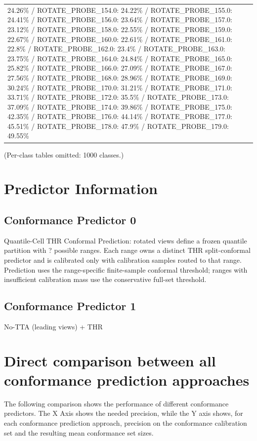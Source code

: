 \documentclass[parskip=half]{scrartcl}
\begin{document}
\begin{tabular}{l|l}
24.26\% / ROTATE_PROBE_154.0: 24.22\% / ROTATE_PROBE_155.0: 24.41\% / ROTATE_PROBE_156.0: 23.64\% / ROTATE_PROBE_157.0: 23.12\% / ROTATE_PROBE_158.0: 22.55\% / ROTATE_PROBE_159.0: 22.67\% / ROTATE_PROBE_160.0: 22.61\% / ROTATE_PROBE_161.0: 22.8\% / ROTATE_PROBE_162.0: 23.4\% / ROTATE_PROBE_163.0: 23.75\% / ROTATE_PROBE_164.0: 24.84\% / ROTATE_PROBE_165.0: 25.82\% / ROTATE_PROBE_166.0: 27.09\% / ROTATE_PROBE_167.0: 27.56\% / ROTATE_PROBE_168.0: 28.96\% / ROTATE_PROBE_169.0: 30.24\% / ROTATE_PROBE_170.0: 31.21\% / ROTATE_PROBE_171.0: 33.71\% / ROTATE_PROBE_172.0: 35.5\% / ROTATE_PROBE_173.0: 37.09\% / ROTATE_PROBE_174.0: 39.86\% / ROTATE_PROBE_175.0: 42.35\% / ROTATE_PROBE_176.0: 44.14\% / ROTATE_PROBE_177.0: 45.51\% / ROTATE_PROBE_178.0: 47.9\% / ROTATE_PROBE_179.0: 49.55\% \
        \end{tabular}
        (Per-class tables omitted: 1000 classes.)
        \section{{Predictor Information}}\subsection{Conformance Predictor 0 }Quantile-Cell THR Conformal Prediction: rotated views define a frozen quantile partition with ? possible ranges. Each range owns a distinct THR split-conformal predictor and is calibrated only with calibration samples routed to that range. Prediction uses the range-specific finite-sample conformal threshold; ranges with insufficient calibration mass use the conservative full-set threshold.\subsection{Conformance Predictor 1 }No-TTA (leading views) + THR\section{Direct comparison between all conformance prediction approaches}
The following comparison shows the performance of different conformance predictors. The X Axis shows the needed precision, while the Y axis shows, for each conformance prediction approach, precision on the conformance calibration set and the resulting mean conformance set sizes.
\end{document}
